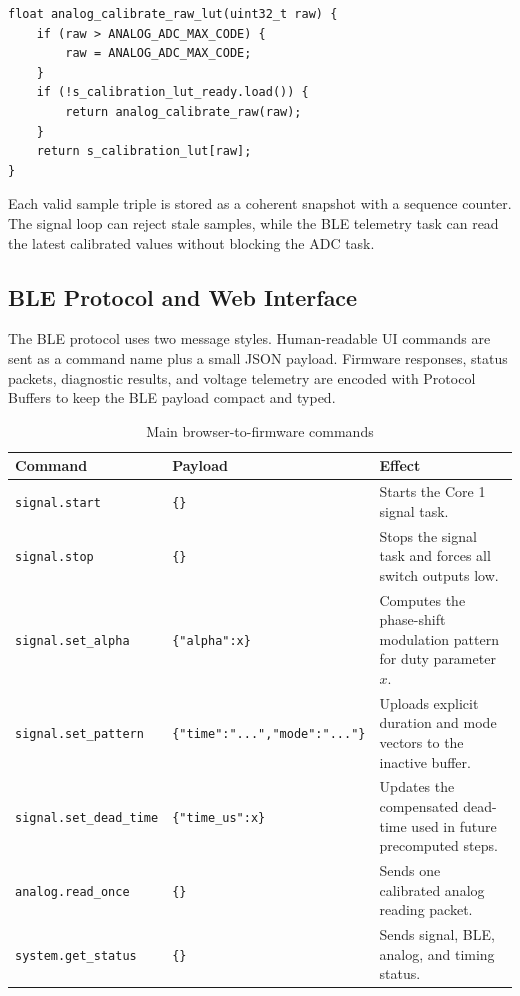 \begin{listing}[H]
\caption{Runtime ADC calibration lookup}
\label{lst:calib}
\begin{verbatim}
float analog_calibrate_raw_lut(uint32_t raw) {
    if (raw > ANALOG_ADC_MAX_CODE) {
        raw = ANALOG_ADC_MAX_CODE;
    }
    if (!s_calibration_lut_ready.load()) {
        return analog_calibrate_raw(raw);
    }
    return s_calibration_lut[raw];
}
\end{verbatim}
\end{listing}

Each valid sample triple is stored as a coherent snapshot with a sequence counter. The
signal loop can reject stale samples, while the BLE telemetry task can read the latest
calibrated values without blocking the ADC task.

\subsection{BLE Protocol and Web Interface}

The BLE protocol uses two message styles. Human-readable UI commands are sent as a
command name plus a small JSON payload. Firmware responses, status packets, diagnostic
results, and voltage telemetry are encoded with Protocol Buffers to keep the BLE
payload compact and typed.

\begin{table}[htbp]
	\centering
	\caption{Main browser-to-firmware commands}
	\label{tab:ble-commands}
	\begin{tabular}{llp{7.4cm}}
		\toprule
		\textbf{Command} & \textbf{Payload} & \textbf{Effect} \\
		\midrule
		\verb|signal.start| & \verb|{}| & Starts the Core 1 signal task. \\
		\verb|signal.stop| & \verb|{}| & Stops the signal task and forces all switch outputs low. \\
		\verb|signal.set_alpha| & \verb|{"alpha":x}| & Computes the phase-shift modulation pattern for duty parameter $x$. \\
		\verb|signal.set_pattern| & \verb|{"time":"...","mode":"..."}| & Uploads explicit duration and mode vectors to the inactive buffer. \\
		\verb|signal.set_dead_time| & \verb|{"time_us":x}| & Updates the compensated dead-time used in future precomputed steps. \\
		\verb|analog.read_once| & \verb|{}| & Sends one calibrated analog reading packet. \\
		\verb|system.get_status| & \verb|{}| & Sends signal, BLE, analog, and timing status. \\
		\bottomrule
	\end{tabular}
\end{table}

